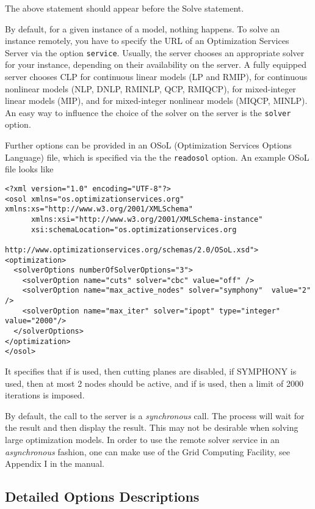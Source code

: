 The above statement should appear before the Solve statement.

By default, for a given instance of a \GAMS model, nothing happens.
To solve an instance remotely, you have to specify the URL of an Optimization Services Server via the option \texttt{service}.
Usually, the server chooses an appropriate solver for your instance, depending on their availability on the server.
A fully equipped server chooses
\textsc{CLP} for continuous linear models (LP and RMIP),
\IPOPT for continuous nonlinear models (NLP, DNLP, RMINLP, QCP, RMIQCP),
\CBC for mixed-integer linear models (MIP), and
\BONMIN for mixed-integer nonlinear models (MIQCP, MINLP).
An easy way to influence the choice of the solver on the server is the \texttt{solver} option.

Further options can be provided in an OSoL (Optimization Services Options Language) file, which is specified via the the \texttt{readosol} option.
An example OSoL file looks like
\begin{verbatim}
<?xml version="1.0" encoding="UTF-8"?>
<osol xmlns="os.optimizationservices.org" xmlns:xs="http://www.w3.org/2001/XMLSchema"
      xmlns:xsi="http://www.w3.org/2001/XMLSchema-instance"
      xsi:schemaLocation="os.optimizationservices.org
                          http://www.optimizationservices.org/schemas/2.0/OSoL.xsd">
<optimization>
  <solverOptions numberOfSolverOptions="3">
    <solverOption name="cuts" solver="cbc" value="off" />
    <solverOption name="max_active_nodes" solver="symphony"  value="2" />
    <solverOption name="max_iter" solver="ipopt" type="integer" value="2000"/>
  </solverOptions>
</optimization>
</osol>
\end{verbatim}
It specifies that if \CBC is used, then cutting planes are disabled,
if \textsc{SYMPHONY} is used, then at most 2 nodes should be active,
and if \IPOPT is used, then a limit of 2000 iterations is imposed.

By default, the call to the server is a \emph{synchronous} call.
The \GAMS process will wait for the result and then display the result.
This may not be desirable when solving large optimization models.
In order to use the remote solver service in an \emph{asynchronous} fashion, one can make use of the \GAMS Grid Computing Facility, see Appendix I in the \GAMS manual.

\subsection{Detailed Options Descriptions}


